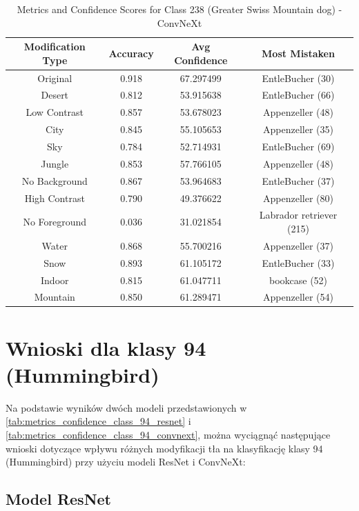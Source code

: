 \begin{table}
	\centering
	\begin{tabular}{|c|c|c|c|}
		\hline
		\textbf{Modification Type} & \textbf{Accuracy} & \textbf{Avg Confidence} & \textbf{Most Mistaken} \\
		\hline
		Original & 0.918 & 67.297499 & EntleBucher (30) \\
		\hline
		Desert & 0.812 & 53.915638 & EntleBucher (66) \\
		\hline
		Low Contrast & 0.857 & 53.678023 & Appenzeller (48) \\
		\hline
		City & 0.845 & 55.105653 & Appenzeller (35) \\
		\hline
		Sky & 0.784 & 52.714931 & EntleBucher (69) \\
		\hline
		Jungle & 0.853 & 57.766105 & Appenzeller (48) \\
		\hline
		No Background & 0.867 & 53.964683 & EntleBucher (37) \\
		\hline
		High Contrast & 0.790 & 49.376622 & Appenzeller (80) \\
		\hline
		No Foreground & 0.036 & 31.021854 & Labrador retriever (215) \\
		\hline
		Water & 0.868 & 55.700216 & Appenzeller (37) \\
		\hline
		Snow & 0.893 & 61.105172 & EntleBucher (33) \\
		\hline
		Indoor & 0.815 & 61.047711 & bookcase (52) \\
		\hline
		Mountain & 0.850 & 61.289471 & Appenzeller (54) \\
		\hline
	\end{tabular}
	\caption{Metrics and Confidence Scores for Class 238 (Greater Swiss Mountain dog) - ConvNeXt}
	\label{tab:metrics_confidence_class_238_convnext}
\end{table}

\section*{Wnioski dla klasy 94 (Hummingbird)}

Na podstawie wyników dwóch modeli przedstawionych w \ref*{tab:metrics_confidence_class_94_resnet} i \ref*{tab:metrics_confidence_class_94_convnext}, można wyciągnąć następujące wnioski dotyczące wpływu różnych 
modyfikacji tła na klasyfikację klasy 94 (Hummingbird) przy użyciu modeli ResNet i ConvNeXt:

\subsection*{Model ResNet}

